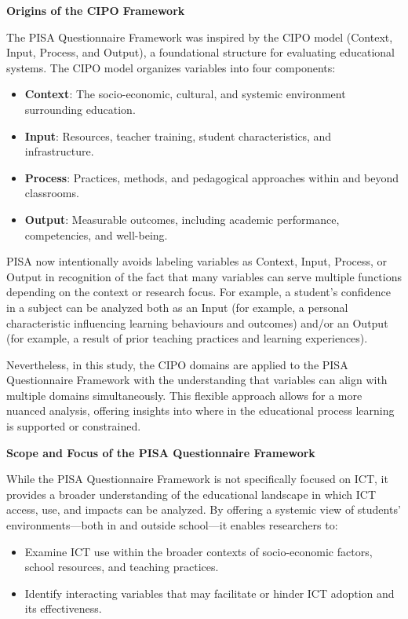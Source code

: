 \documentclass[
]{article}
\begin{document}
\textbf{Origins of the CIPO Framework}

The PISA Questionnaire Framework was inspired by the CIPO model
(Context, Input, Process, and Output), a foundational structure for
evaluating educational systems. The CIPO model organizes variables into
four components:

\begin{itemize}
\item
  \textbf{Context}: The socio-economic, cultural, and systemic
  environment surrounding education.
\item
  \textbf{Input}: Resources, teacher training, student characteristics,
  and infrastructure.
\item
  \textbf{Process}: Practices, methods, and pedagogical approaches
  within and beyond classrooms.
\item
  \textbf{Output}: Measurable outcomes, including academic performance,
  competencies, and well-being.
\end{itemize}

PISA now intentionally avoids labeling variables as Context, Input,
Process, or Output in recognition of the fact that many variables can
serve multiple functions depending on the context or research focus. For
example, a student's confidence in a subject can be analyzed both as an
Input (for example, a personal characteristic influencing learning
behaviours and outcomes) and/or an Output (for example, a result of
prior teaching practices and learning experiences).

Nevertheless, in this study, the CIPO domains are applied to the PISA
Questionnaire Framework with the understanding that variables can align
with multiple domains simultaneously. This flexible approach allows for
a more nuanced analysis, offering insights into where in the educational
process learning is supported or constrained.

\textbf{Scope and Focus of the PISA Questionnaire Framework}

While the PISA Questionnaire Framework is not specifically focused on
ICT, it provides a broader understanding of the educational landscape in
which ICT access, use, and impacts can be analyzed. By offering a
systemic view of students' environments---both in and outside
school---it enables researchers to:

\begin{itemize}
\item
  Examine ICT use within the broader contexts of socio-economic factors,
  school resources, and teaching practices.
\item
  Identify interacting variables that may facilitate or hinder ICT
  adoption and its effectiveness.
\end{itemize}
\end{document}
